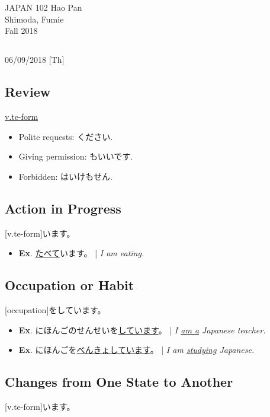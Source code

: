 \documentclass{article}
\begin{document}
\begin{CJK}{UTF8}{min}

\noindent
{JAPAN 102 \hfill Hao Pan}\\
{Shimoda, Fumie}\\
{Fall 2018}


\begin{center}
\section{}
\noindent
{\hfill 06/09/2018 [Th]}
\end{center}

\subsection{Review}

\uline{v.te-form}
\begin{itemize}
\item Polite requests: ください.
\item Giving permission: もいいです.
\item Forbidden: はいけもせん.
\end{itemize}


\subsection{Action in Progress}
[v.te-form]います。

\begin{itemize}
\item \textbf{Ex}. \uline{たべて}います。 | \textit{I am eating.}
\end{itemize}


\subsection{Occupation or Habit}
[occupation]をしています。

\begin{itemize}
\item \textbf{Ex}. にほんごのせんせいを\uline{しています}。 | \textit{I \uline{am a} Japanese teacher.}
\item \textbf{Ex}. にほんごを\uline{べんきょしています}。 | \textit{I am \uline{studying} Japanese.}
\end{itemize}


\subsection{Changes from One State to Another}
[v.te-form]います。


\end{CJK}
\end{document}

